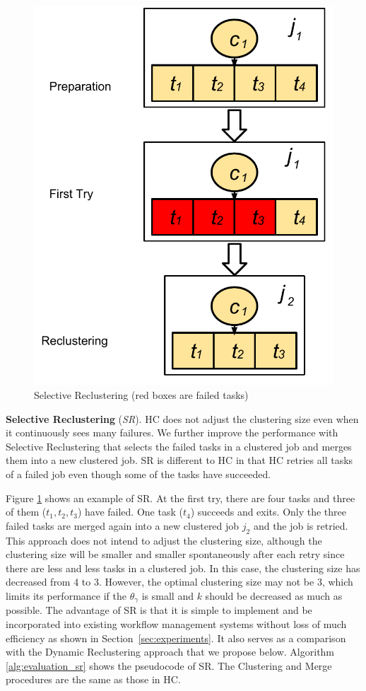 \documentclass{IOS-Book-Article}
\begin{document}
\begin{figure}[!htb]
\centering
  \includegraphics[width=0.40\linewidth]{sr.pdf}
  \caption{Selective Reclustering (red boxes are failed tasks)}
  \label{fig:clustering_sr}
\end{figure}

\textbf{Selective Reclustering} (\emph{SR}). HC does not adjust the clustering size even when it continuously sees many failures. We further improve the performance with Selective Reclustering that selects the failed tasks in a clustered job and merges them into a new clustered job. SR is different to HC in that HC retries all tasks of a failed job even though some of the tasks have succeeded. 

Figure \ref{fig:clustering_sr} shows an example of SR. At the first try, there are four tasks and three of them ($t_1, t_2, t_3$) have failed. One task ($t_4$) succeeds and exits. Only the three failed tasks are merged again into a new clustered job $j_2$ and the job is retried. This approach does not intend to adjust the clustering size, although the clustering size will be smaller and smaller spontaneously after each retry since there are less and less tasks in a clustered job. In this case, the clustering size has decreased from 4 to 3. However, the optimal clustering size may not be 3, which limits its performance if the $\theta_{\gamma}$ is small and $k$ should be decreased as much as possible. The advantage of SR is that it is simple to implement and be incorporated into existing workflow management systems without loss of much efficiency as shown in Section~\ref{sec:experiments}. It also serves as a comparison with the Dynamic Reclustering approach that we propose below. Algorithm \ref{alg:evaluation_sr} shows the pseudocode of SR. The Clustering and Merge procedures are the same as those in HC. 
\end{document}
